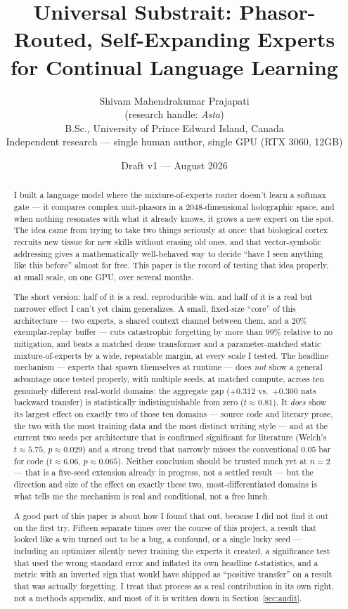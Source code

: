 \documentclass[11pt,letterpaper]{article}
\title{\textbf{Universal Substrait: Phasor-Routed, Self-Expanding Experts for Continual Language Learning}}
\author{Shivam Mahendrakumar Prajapati \\ {\small (research handle: \textit{Asta})} \\[2pt] \small B.Sc., University of Prince Edward Island, Canada \\ \small Independent research --- single human author, single GPU (RTX 3060, 12GB)}
\date{Draft v1 --- August 2026}
\begin{document}
\maketitle

\begin{abstract}
\noindent
I built a language model where the mixture-of-experts router doesn't learn a softmax gate --- it compares complex unit-phasors in a 2048-dimensional holographic space, and when nothing resonates with what it already knows, it grows a new expert on the spot. The idea came from trying to take two things seriously at once: that biological cortex recruits new tissue for new skills without erasing old ones, and that vector-symbolic addressing gives a mathematically well-behaved way to decide ``have I seen anything like this before'' almost for free. This paper is the record of testing that idea properly, at small scale, on one GPU, over several months.

The short version: half of it is a real, reproducible win, and half of it is a real but narrower effect I can't yet claim generalizes. A small, fixed-size ``core'' of this architecture --- two experts, a shared context channel between them, and a 20\% exemplar-replay buffer --- cuts catastrophic forgetting by more than 99\% relative to no mitigation, and beats a matched dense transformer and a parameter-matched static mixture-of-experts by a wide, repeatable margin, at every scale I tested. The headline mechanism --- experts that spawn themselves at runtime --- does \emph{not} show a general advantage once tested properly, with multiple seeds, at matched compute, across ten genuinely different real-world domains: the aggregate gap ($+0.312$ vs.\ $+0.300$ nats backward transfer) is statistically indistinguishable from zero ($t \approx 0.81$). It \emph{does} show its largest effect on exactly two of those ten domains --- source code and literary prose, the two with the most training data and the most distinct writing style --- and at the current two seeds per architecture that is confirmed significant for literature (Welch's $t\approx5.75$, $p\approx0.029$) and a strong trend that narrowly misses the conventional 0.05 bar for code ($t\approx6.06$, $p\approx0.065$). Neither conclusion should be trusted much yet at $n=2$ --- that is a five-seed extension already in progress, not a settled result --- but the direction and size of the effect on exactly these two, most-differentiated domains is what tells me the mechanism is real and conditional, not a free lunch.

A good part of this paper is about how I found that out, because I did not find it out on the first try. Fifteen separate times over the course of this project, a result that looked like a win turned out to be a bug, a confound, or a single lucky seed --- including an optimizer silently never training the experts it created, a significance test that used the wrong standard error and inflated its own headline $t$-statistics, and a metric with an inverted sign that would have shipped as ``positive transfer'' on a result that was actually forgetting. I treat that process as a real contribution in its own right, not a methods appendix, and most of it is written down in Section~\ref{sec:audit}.
\end{abstract}
\end{document}
